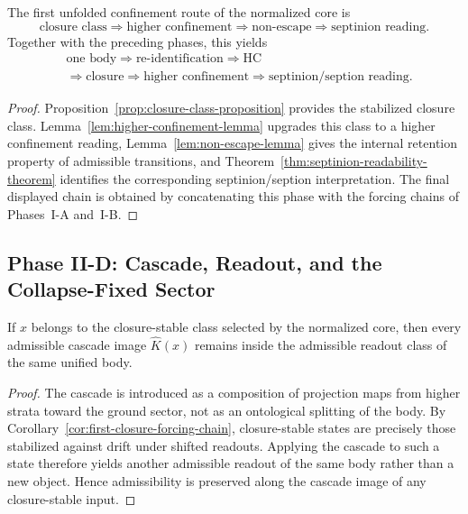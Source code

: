 \begin{corollary}
\label{cor:first-confinement-forcing-chain}
The first unfolded confinement route of the normalized core is
\[
\text{closure class}
\Longrightarrow
\text{higher confinement}
\Longrightarrow
\text{non-escape}
\Longrightarrow
\text{septinion reading}.
\]
Together with the preceding phases, this yields
\[
\begin{aligned}
&\text{one body} \Longrightarrow \text{re-identification} \Longrightarrow \mathrm{HC}\\
&\Longrightarrow \text{closure} \Longrightarrow \text{higher confinement} \Longrightarrow \text{septinion/seption reading}.
\end{aligned}
\]
\end{corollary}

\begin{proof}
Proposition~\ref{prop:closure-class-proposition} provides the stabilized
closure class. Lemma~\ref{lem:higher-confinement-lemma} upgrades this class to a
higher confinement reading, Lemma~\ref{lem:non-escape-lemma} gives the internal
retention property of admissible transitions, and
Theorem~\ref{thm:septinion-readability-theorem} identifies the corresponding
septinion/seption interpretation. The final displayed chain is obtained by
concatenating this phase with the forcing chains of Phases~I-A and~I-B.
\end{proof}


\subsection*{Phase II-D: Cascade, Readout, and the Collapse-Fixed Sector}

\begin{lemma}
\label{lem:cascade-admissibility-lemma}
If $x$ belongs to the closure-stable class selected by the normalized core,
then every admissible cascade image $\hat K(x)$ remains inside the admissible
readout class of the same unified body.
\end{lemma}

\begin{proof}
The cascade is introduced as a composition of projection maps from higher
strata toward the ground sector, not as an ontological splitting of the body.
By Corollary~\ref{cor:first-closure-forcing-chain}, closure-stable states are
precisely those stabilized against drift under shifted readouts. Applying the
cascade to such a state therefore yields another admissible readout of the same
body rather than a new object. Hence admissibility is preserved along the
cascade image of any closure-stable input.
\end{proof}

